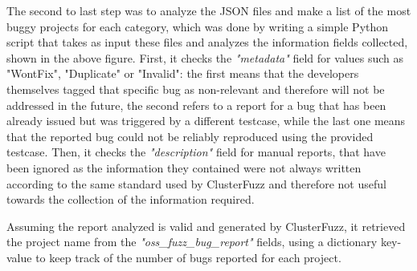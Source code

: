 The second to last step was to analyze the JSON files and make a list of the most buggy projects for each category, which was done by writing a simple Python script that takes as input these files and analyzes the information fields collected, shown in the above figure. First, it checks the \textit{"metadata"} field for values such as "WontFix", "Duplicate" or "Invalid": the first means that the developers themselves tagged that specific bug as non-relevant and therefore will not be addressed in the future, the second refers to a report for a bug that has been already issued but was triggered by a different testcase, while the last one means that the reported bug could not be reliably reproduced using the provided testcase. Then, it checks the \textit{"description"} field for manual reports, that have been ignored as the information they contained were not always written according to the same standard used by ClusterFuzz and therefore not useful towards the collection of the information required. 

Assuming the report analyzed is valid and generated by ClusterFuzz, it retrieved the project name from the \textit{"oss\_fuzz\_bug\_report"} fields, using a dictionary key-value to keep track of the number of bugs reported for each project. 

